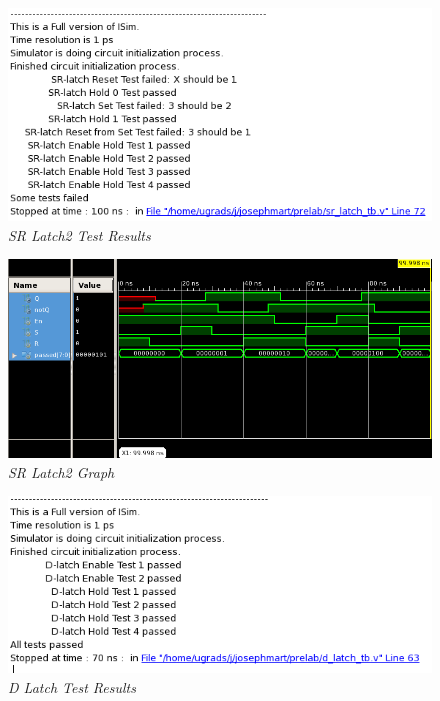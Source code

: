 \documentclass[a4paper,12pt]{article}
\begin{document}
  \begin{figure}[h]
    \begin{center}
      \includegraphics[scale=0.5]{sr_latch2_tests.png}
      \caption{\textit{SR Latch2 Test Results}}
    \end{center}
  \end{figure}
  
  \newpage
  
  \begin{figure}[h]
    \begin{center}
      \includegraphics[scale=0.2]{sr_latch2_graph.png}
      \caption{\textit{SR Latch2 Graph}}
    \end{center}
  \end{figure}
  
  \begin{figure}[h]
    \begin{center}
      \includegraphics[scale=0.5]{D_latch_tests.png}
      \caption{\textit{D Latch Test Results}}
    \end{center}
  \end{figure}  
  
\end{document}
